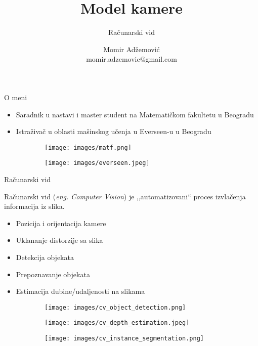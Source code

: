 \documentclass[bookmarks=true,bookmarksopen=true,pdfborder={0 0 0},pdfhighlight={/N},linkbordercolor={.5 .5 .5},implicit=false,unicode,xcolor={table}]{beamer}
\begin{document}
\title{Model kamere}
\author{Momir Adžemović\\ \small{momir.adzemovic@gmail.com}}
\subtitle{Računarski vid}
\date{}

\begin{frame}

  \titlepage{}

\end{frame}

\begin{frame}{O meni}

  \begin{itemize}
    \item Saradnik u nastavi i master student na Matematičkom fakultetu u Beogradu
    \item Istraživač u oblasti mašinskog učenja u Everseen-u u Beogradu
  \end{itemize}

  \begin{figure}
		\begin{subfigure}{3cm}
			\texttt{[image: images/matf.png]}
		\end{subfigure}
    \hfill
		\begin{subfigure}{3cm}
			\texttt{[image: images/everseen.jpeg]}
		\end{subfigure}
	\end{figure}
  \hfill

\end{frame}

\begin{frame}{Računarski vid}

Računarski vid (\textit{eng. Computer Vision}) je ,,automatizovani`` proces izvlačenja informacija iz slika.
\begin{itemize}
  \item Pozicija i orijentacija kamere
  \item Uklananje distorzije sa slika
  \item Detekcija objekata
  \item Prepoznavanje objekata
  \item Estimacija dubine/udaljenosti na slikama
\end{itemize}

\begin{figure}
		
  \begin{subfigure}{4cm}
    \texttt{[image: images/cv\_object\_detection.png]}
  \end{subfigure}
  \begin{subfigure}{4cm}
    \texttt{[image: images/cv\_depth\_estimation.jpeg]}
  \end{subfigure}
  \begin{subfigure}{2cm}
    \texttt{[image: images/cv\_instance\_segmentation.png]}
  \end{subfigure}
\end{figure}

\end{frame}
\end{document}
